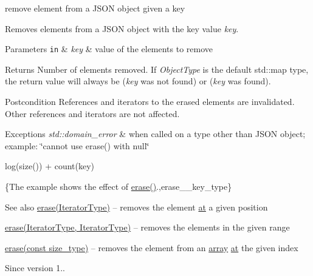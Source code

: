remove element from a J\+S\+O\+N object given a key 

Removes elements from a J\+S\+O\+N object with the key value {\itshape key}.


\begin{DoxyParams}[1]{Parameters}
\mbox{\tt in}  & {\em key} & value of the elements to remove\\
\hline
\end{DoxyParams}
\begin{DoxyReturn}{Returns}
Number of elements removed. If {\itshape Object\+Type} is the default {\ttfamily std\+::map} type, the return value will always be {} ({\itshape key} was not found) or {} ({\itshape key} was found).
\end{DoxyReturn}
\begin{DoxyPostcond}{Postcondition}
References and iterators to the erased elements are invalidated. Other references and iterators are not affected.
\end{DoxyPostcond}

\begin{DoxyExceptions}{Exceptions}
{\em std\+::domain\+\_\+error} & when called on a type other than J\+S\+O\+N object; example\+: {\ttfamily \char`\"{}cannot use erase() with null\char`\"{}}\\
\hline
\end{DoxyExceptions}
{\ttfamily log(size()) + count(key)}

\{The example shows the effect of {\ttfamily \hyperlink{classnlohmann_1_1basic__json_ab9f8c9a02d6bb794ee26801a232ca4f4}{erase()}}.,erase\+\_\+\+\_\+key\+\_\+type\}

\begin{DoxySeeAlso}{See also}
\hyperlink{classnlohmann_1_1basic__json_ab9f8c9a02d6bb794ee26801a232ca4f4}{erase(\+Iterator\+Type)} -- removes the element \hyperlink{classnlohmann_1_1basic__json_a214a8c22d616fd3567b88932c07436c9}{at} a given position 

\hyperlink{classnlohmann_1_1basic__json_aa8996e3f8cd3e5113dcc3cb34bef7c0a}{erase(\+Iterator\+Type, Iterator\+Type)} -- removes the elements in the given range 

\hyperlink{classnlohmann_1_1basic__json_a3da254c422ede5495f2815c5e48c00c5}{erase(const size\+\_\+type)} -- removes the element from an \hyperlink{classnlohmann_1_1basic__json_a5685815624b086caa532f41e853d4b0f}{array} \hyperlink{classnlohmann_1_1basic__json_a214a8c22d616fd3567b88932c07436c9}{at} the given index
\end{DoxySeeAlso}
\begin{DoxySince}{Since}
version 1.. 
\end{DoxySince}


